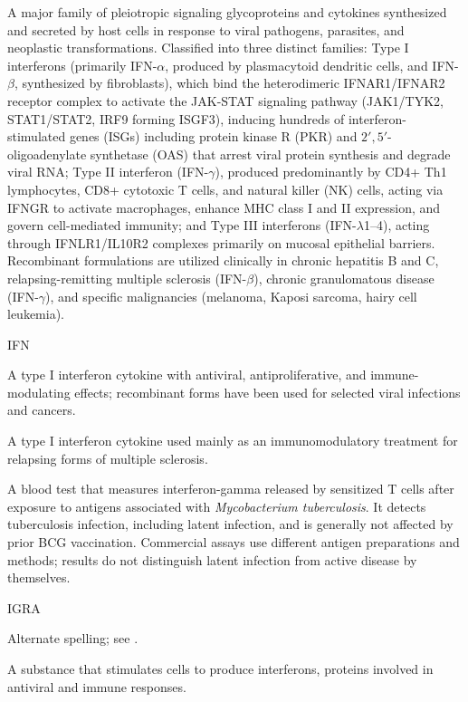  A major family of pleiotropic signaling glycoproteins and cytokines synthesized and secreted by host cells in response to viral pathogens, parasites, and neoplastic transformations. Classified into three distinct families: Type I interferons (primarily IFN-$\alpha$, produced by plasmacytoid dendritic cells, and IFN-$\beta$, synthesized by fibroblasts), which bind the heterodimeric IFNAR1/IFNAR2 receptor complex to activate the JAK-STAT signaling pathway (JAK1/TYK2, STAT1/STAT2, IRF9 forming ISGF3), inducing hundreds of interferon-stimulated genes (ISGs) including protein kinase R (PKR) and $2',5'$-oligoadenylate synthetase (OAS) that arrest viral protein synthesis and degrade viral RNA; Type II interferon (IFN-$\gamma$), produced predominantly by CD4+ Th1 lymphocytes, CD8+ cytotoxic T cells, and natural killer (NK) cells, acting via IFNGR to activate macrophages, enhance MHC class I and II expression, and govern cell-mediated immunity; and Type III interferons (IFN-$\lambda$1--4), acting through IFNLR1/IL10R2 complexes primarily on mucosal epithelial barriers. Recombinant formulations are utilized clinically in chronic hepatitis B and C, relapsing-remitting multiple sclerosis (IFN-$\beta$), chronic granulomatous disease (IFN-$\gamma$), and specific malignancies (melanoma, Kaposi sarcoma, hairy cell leukemia).

\synonyms
IFN

 A type I interferon cytokine with antiviral, antiproliferative, and immune-modulating effects; recombinant forms have been used for selected viral infections and cancers.

 A type I interferon cytokine used mainly as an immunomodulatory treatment for relapsing forms of multiple sclerosis.

 A blood test that measures interferon-gamma released
by sensitized T cells after exposure to antigens associated with \textit{Mycobacterium
tuberculosis}. It detects tuberculosis infection, including latent infection, and is generally
not affected by prior BCG vaccination. Commercial assays use different antigen preparations
and methods; results do not distinguish latent infection from active disease by themselves.

\synonyms
IGRA

 Alternate spelling; see .

 A substance that stimulates cells to produce interferons, proteins involved in antiviral and immune responses.

